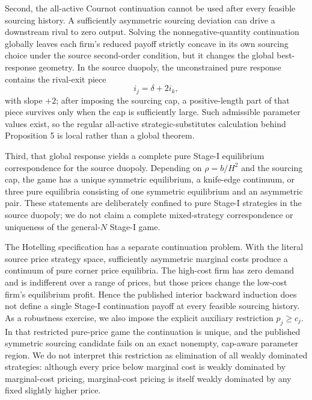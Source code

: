 Second, the all-active Cournot continuation cannot be used after every feasible sourcing history.  A sufficiently asymmetric sourcing deviation can drive a downstream rival to zero output.  Solving the nonnegative-quantity continuation globally leaves each firm's reduced payoff strictly concave in its own sourcing choice under the source second-order condition, but it changes the global best-response geometry.  In the source duopoly, the unconstrained pure response contains the rival-exit piece
\[
i_j=\delta+2i_k,
\]
with slope \(+2\); after imposing the sourcing cap, a positive-length part of that piece survives only when the cap is sufficiently large.  Such admissible parameter values exist, so the regular all-active strategic-substitutes calculation behind Proposition 5 is local rather than a global theorem.

Third, that global response yields a complete pure Stage-I equilibrium correspondence for the source duopoly.  Depending on \(\rho=b/H^2\) and the sourcing cap, the game has a unique symmetric equilibrium, a knife-edge continuum, or three pure equilibria consisting of one symmetric equilibrium and an asymmetric pair.  These statements are deliberately confined to pure Stage-I strategies in the source duopoly; we do not claim a complete mixed-strategy correspondence or uniqueness of the general-\(N\) Stage-I game.

The Hotelling specification has a separate continuation problem.  With the literal source price strategy space, sufficiently asymmetric marginal costs produce a continuum of pure corner price equilibria.  The high-cost firm has zero demand and is indifferent over a range of prices, but those prices change the low-cost firm's equilibrium profit.  Hence the published interior backward induction does not define a single Stage-I continuation payoff at every feasible sourcing history.  As a robustness exercise, we also impose the explicit auxiliary restriction \(p_j\ge c_j\).  In that restricted pure-price game the continuation is unique, and the published symmetric sourcing candidate fails on an exact nonempty, cap-aware parameter region.  We do not interpret this restriction as elimination of all weakly dominated strategies: although every price below marginal cost is weakly dominated by marginal-cost pricing, marginal-cost pricing is itself weakly dominated by any fixed slightly higher price.


